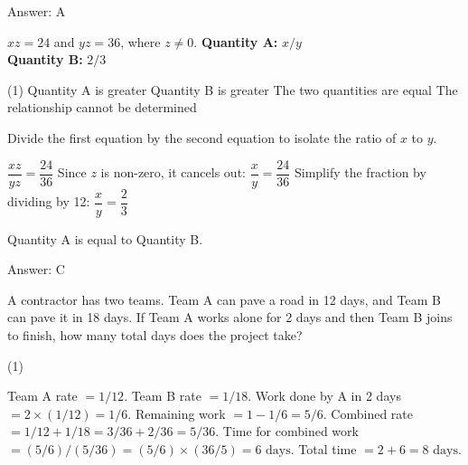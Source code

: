 \documentclass[11pt,paper=a4,answers]{exam}
\begin{document}
\begin{questions}
\begin{solution}
Answer: \colorbox{yellow!100}{A}
\end{solution}

\vspace{1cm}

\question
$xz = 24$ and $yz = 36$, where $z \neq 0$.
\vspace{5pt}
\textbf{Quantity A: } $x/y$ \\
\vspace{5pt}
\textbf{Quantity B: } $2/3$

\begin{tasks}(1)
\task[A)] Quantity A is greater
\task[B)] Quantity B is greater
\task[C)] The two quantities are equal
\task[D)] The relationship cannot be determined
\end{tasks}

\begin{solution}
Divide the first equation by the second equation to isolate the ratio of $x$ to $y$.
\vspace{5pt}
\begin{center}
$\dfrac{xz}{yz} = \dfrac{24}{36}$
\vspace{5pt}
Since $z$ is non-zero, it cancels out:
\vspace{5pt}
$\dfrac{x}{y} = \dfrac{24}{36}$
\vspace{5pt}
Simplify the fraction by dividing by 12:
\vspace{5pt}
$\dfrac{x}{y} = \dfrac{2}{3}$
\end{center}
\vspace{5pt}
Quantity A is equal to Quantity B.

Answer: \colorbox{yellow!100}{C}
\end{solution}

\vspace{1cm}


\question
A contractor has two teams. Team A can pave a road in 12 days, and Team B can pave it in 18 days. If Team A works alone for 2 days and then Team B joins to finish, how many total days does the project take?

\begin{tasks}(1)
    
\end{tasks}

\begin{solution}
\begin{center}
Team A rate $= 1/12$. Team B rate $= 1/18$.
\vspace{5pt}
Work done by A in 2 days $= 2 \times (1/12) = 1/6$.
\vspace{5pt}
Remaining work $= 1 - 1/6 = 5/6$.
\vspace{5pt}
Combined rate $= 1/12 + 1/18 = 3/36 + 2/36 = 5/36$.
\vspace{5pt}
Time for combined work $= (5/6) / (5/36) = (5/6) \times (36/5) = 6 \text{ days}$.
\vspace{5pt}
Total time $= 2 + 6 = 8 \text{ days}$.
\end{center}


\end{solution}
\end{questions}
\end{document}
